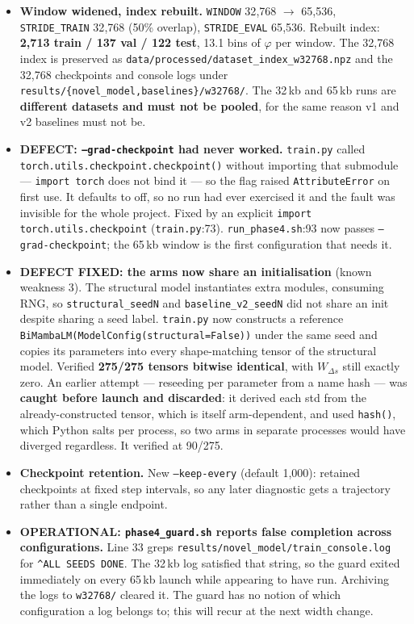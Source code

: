 \documentclass[11pt,a4paper]{article}
\newcommand{\code}[1]{\texttt{\small #1}}
\begin{document}
\begin{itemize}
\item \textbf{Window widened, index rebuilt.} \code{WINDOW} 32{,}768 $\to$
65{,}536, \code{STRIDE\_TRAIN} 32{,}768 (50\% overlap), \code{STRIDE\_EVAL}
65{,}536. Rebuilt index: \textbf{2{,}713 train / 137 val / 122 test}, 13.1
bins of $\varphi$ per window. The 32{,}768 index is preserved as
\code{data/processed/dataset\_index\_w32768.npz} and the 32{,}768 checkpoints
and console logs under \code{results/\{novel\_model,baselines\}/w32768/}. The
32\,kb and 65\,kb runs are \textbf{different datasets and must not be pooled},
for the same reason v1 and v2 baselines must not be.

\item \textbf{DEFECT: \code{--grad-checkpoint} had never worked.}
\code{train.py} called \code{torch.utils.checkpoint.checkpoint()} without
importing that submodule --- \code{import torch} does not bind it --- so the
flag raised \code{AttributeError} on first use. It defaults to off, so no run
had ever exercised it and the fault was invisible for the whole project. Fixed
by an explicit \code{import torch.utils.checkpoint} (\code{train.py}:73).
\code{run\_phase4.sh}:93 now passes \code{--grad-checkpoint}; the 65\,kb window
is the first configuration that needs it.

\item \textbf{DEFECT FIXED: the arms now share an initialisation} (known
weakness 3). The structural model instantiates extra modules, consuming RNG, so
\code{structural\_seedN} and \code{baseline\_v2\_seedN} did not share an init
despite sharing a seed label. \code{train.py} now constructs a reference
\code{BiMambaLM(ModelConfig(structural=False))} under the same seed and copies
its parameters into every shape-matching tensor of the structural model.
Verified \textbf{275/275 tensors bitwise identical}, with $W_{\Delta s}$ still
exactly zero. An earlier attempt --- reseeding per parameter from a name hash
--- was \textbf{caught before launch and discarded}: it derived each std from
the already-constructed tensor, which is itself arm-dependent, and used
\code{hash()}, which Python salts per process, so two arms in separate
processes would have diverged regardless. It verified at 90/275.

\item \textbf{Checkpoint retention.} New \code{--keep-every} (default 1{,}000):
retained checkpoints at fixed step intervals, so any later diagnostic gets a
trajectory rather than a single endpoint.

\item \textbf{OPERATIONAL: \code{phase4\_guard.sh} reports false completion
across configurations.} Line 33 greps
\code{results/novel\_model/train\_console.log} for \verb|^ALL SEEDS DONE|. The
32\,kb log satisfied that string, so the guard exited immediately on every
65\,kb launch while appearing to have run. Archiving the logs to
\code{w32768/} cleared it. The guard has no notion of which configuration a
log belongs to; this will recur at the next width change.


\end{itemize}
\end{document}
